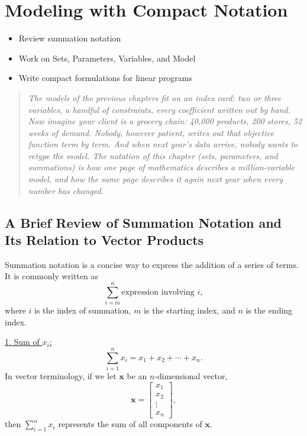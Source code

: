 \chapter{Modeling with Compact Notation}

\begin{outcome}
\begin{itemize}
\item Review summation notation
\item Work on Sets, Parameters, Variables, and Model
\item Write compact formulations for linear programs
\end{itemize}
\end{outcome}

\begin{quote}
\itshape The models of the previous chapters fit on an index card: two or three variables, a handful of constraints, every coefficient written out by hand. Now imagine your client is a grocery chain: 40{,}000 products, 200 stores, 52 weeks of demand. Nobody, however patient, writes out that objective function term by term. And when next year's data arrive, nobody wants to retype the model. The notation of this chapter (sets, parameters, and summations) is how one page of mathematics describes a million-variable model, and how the same page describes it again next year when every number has changed.
\end{quote}

\section*{A Brief Review of Summation Notation and Its Relation to Vector Products}

Summation notation is a concise way to express the addition of a series of terms. It is commonly written as
\[
\sum_{i=m}^{n} \text{expression involving } i,
\]
where \(i\) is the index of summation, \(m\) is the starting index, and \(n\) is the ending index.

\underline{1. Sum of \(x_i\):}
\[
\sum_{i=1}^{n} x_i = x_1 + x_2 + \cdots + x_n.
\]
In vector terminology, if we let \(\mathbf{x}\) be an \(n\)-dimensional vector,
\[
\mathbf{x} = \begin{bmatrix} x_1 \\ x_2 \\ \vdots \\ x_n \end{bmatrix},
\]
then \(\sum_{i=1}^{n} x_i\) represents the sum of all components of \(\mathbf{x}\).


